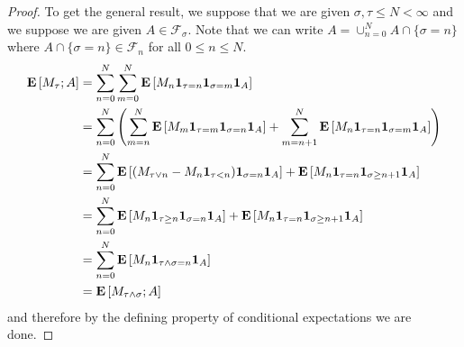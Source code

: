 \begin{proof}
To get the general result, we suppose that we are given $\sigma, \tau
\leq N < \infty$
and we suppose we are given $A \in \mathcal{F}_\sigma$.  Note that we
can write $A = \cup_{n=0}^N A \cap \lbrace \sigma=n\rbrace$ where
$A \cap \lbrace \sigma=n\rbrace \in \mathcal{F}_n$ for all $0 \leq n
\leq N$.
\begin{align*}
\textbf{E}\left[M_\tau ; A\right] &= \sum_{n=0}^N \sum_{m=0}^N \textbf{E}\left[M_n
  \textbf{1}_{\tau=n} \textbf{1}_{\sigma=m}
  \textbf{1}_{A}\right] \\
&= \sum_{n=0}^N \left (
\sum_{m=n}^N \textbf{E}\left[M_m
  \textbf{1}_{\tau=m} \textbf{1}_{\sigma=n} \textbf{1}_{A}\right]+
\sum_{m=n+1}^N \textbf{E}\left[M_n
  \textbf{1}_{\tau=n} \textbf{1}_{\sigma=m}\textbf{1}_{A}\right]
\right) \\
&=\sum_{n=0}^N \textbf{E}\left[(M_{\tau \vee n} - M_n
  \textbf{1}_{\tau < n})\textbf{1}_{\sigma=n}
  \textbf{1}_{A}\right] + 
\textbf{E}\left[M_n
  \textbf{1}_{\tau=n} \textbf{1}_{\sigma \geq
    n+1}\textbf{1}_{A}\right] \\
&=\sum_{n=0}^N \textbf{E}\left[M_n  \textbf{1}_{\tau\geq n}\textbf{1}_{\sigma=n}
  \textbf{1}_{A}\right] + 
\textbf{E}\left[M_n
  \textbf{1}_{\tau=n} \textbf{1}_{\sigma \geq
    n+1}\textbf{1}_{A}\right] \\
&=\sum_{n=0}^N \textbf{E}\left[M_n \textbf{1}_{\tau \wedge \sigma =
    n}  \textbf{1}_{A}\right] \\
&= \textbf{E}\left[M_{\tau \wedge \sigma} ; A\right]
\end{align*}
and therefore by the defining property of conditional expectations we
are done.


\end{proof}
